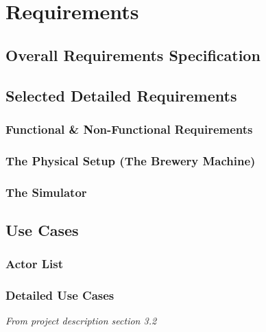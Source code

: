 \section{Requirements}

\subsection{Overall Requirements Specification}

\subsection{Selected Detailed Requirements}

\subsubsection{Functional \& Non-Functional Requirements}

\subsubsection{The Physical Setup (The Brewery Machine)}

\subsubsection{The Simulator}


\subsection{Use Cases}

\subsubsection{Actor List}

\subsubsection{Detailed Use Cases}
\textit{From project description section 3.2}

